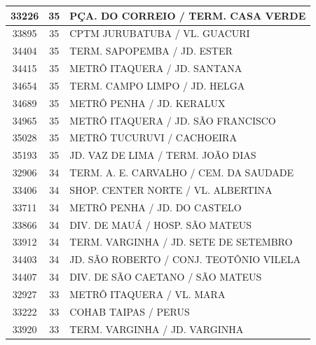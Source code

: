 \documentclass[
	12pt,				%
	oneside,			%
	a4paper,			%
	english,			%
	brazil				%
	]{abntex2ppgsi}
\begin{document}
\begin{apendicesenv}
\begin{longtable}{c|c|p{7cm}}
    33226 & 35    & PÇA. DO CORREIO / TERM. CASA VERDE \\
\hline

    33895 & 35    & CPTM JURUBATUBA / VL. GUACURI \\
\hline

    34404 & 35    & TERM. SAPOPEMBA / JD. ESTER \\
\hline

    34415 & 35    & METRÔ ITAQUERA / JD. SANTANA \\
\hline

    34654 & 35    & TERM. CAMPO LIMPO / JD. HELGA \\
\hline

    34689 & 35    & METRÔ PENHA / JD. KERALUX \\
\hline

    34965 & 35    & METRÔ ITAQUERA / JD. SÃO FRANCISCO \\
\hline

    35028 & 35    & METRÔ TUCURUVI / CACHOEIRA \\
\hline

    35193 & 35    & JD. VAZ DE LIMA / TERM. JOÃO DIAS \\
\hline

    32906 & 34    & TERM. A. E. CARVALHO / CEM. DA SAUDADE \\
\hline

    33406 & 34    & SHOP. CENTER NORTE / VL. ALBERTINA \\
\hline

    33711 & 34    & METRÔ PENHA / JD. DO CASTELO \\
\hline

    33866 & 34    & DIV. DE MAUÁ / HOSP. SÃO MATEUS \\
\hline

    33912 & 34    & TERM. VARGINHA / JD. SETE DE SETEMBRO \\
\hline

    34403 & 34    & JD. SÃO ROBERTO / CONJ. TEOTÔNIO VILELA \\
\hline

    34407 & 34    & DIV. DE SÃO CAETANO / SÃO MATEUS \\
\hline

    32927 & 33    & METRÔ ITAQUERA / VL. MARA \\
\hline

    33222 & 33    & COHAB TAIPAS / PERUS \\
\hline

    33920 & 33    & TERM. VARGINHA / JD. VARGINHA \\
\hline


\end{longtable}
\end{apendicesenv}
\end{document}
